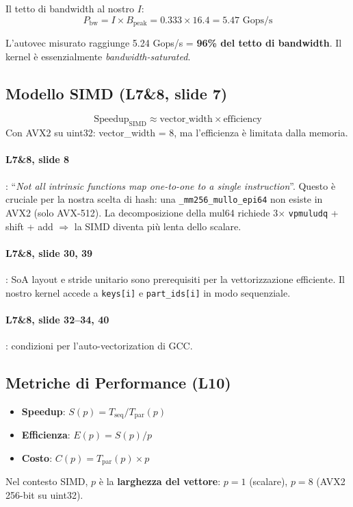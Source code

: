 \documentclass[11pt,a4paper]{article}
\begin{document}
Il tetto di bandwidth al nostro $I$:
$$P_\text{bw} = I \times B_\text{peak} = 0.333 \times 16.4 = 5.47 \text{ Gops/s}$$

L'autovec misurato raggiunge 5.24 Gops/s = \textbf{96\% del tetto di bandwidth}. Il kernel è essenzialmente \textit{bandwidth-saturated}.


\subsection{Modello SIMD (L7\&8, slide 7)}

\begin{theorybox}[title=\textbf{Speedup SIMD teorico}]
$$\text{Speedup}_\text{SIMD} \approx \text{vector\_width} \times \text{efficiency}$$
Con AVX2 su uint32: vector\_width = 8, ma l'efficienza è limitata dalla memoria.
\end{theorybox}

\paragraph{L7\&8, slide 8}: ``\textit{Not all intrinsic functions map one-to-one to a single instruction}''. Questo è cruciale per la nostra scelta di hash: una \texttt{\_mm256\_mullo\_epi64} non esiste in AVX2 (solo AVX-512). La decomposizione della mul64 richiede 3$\times$ \texttt{vpmuludq} + shift + add $\Rightarrow$ la SIMD diventa più lenta dello scalare.

\paragraph{L7\&8, slide 30, 39}: SoA layout e stride unitario sono prerequisiti per la vettorizzazione efficiente. Il nostro kernel accede a \texttt{keys[i]} e \texttt{part\_ids[i]} in modo sequenziale.

\paragraph{L7\&8, slide 32--34, 40}: condizioni per l'auto-vectorization di GCC.


\subsection{Metriche di Performance (L10)}

\begin{theorybox}[title=\textbf{Definizioni formali (L10, slide 5--6)}]
\begin{itemize}
    \item \textbf{Speedup}: $S(p) = T_\text{seq} / T_\text{par}(p)$
    \item \textbf{Efficienza}: $E(p) = S(p) / p$
    \item \textbf{Costo}: $C(p) = T_\text{par}(p) \times p$
\end{itemize}
Nel contesto SIMD, $p$ è la \textbf{larghezza del vettore}: $p=1$ (scalare), $p=8$ (AVX2 256-bit su uint32).
\end{theorybox}
\end{document}
